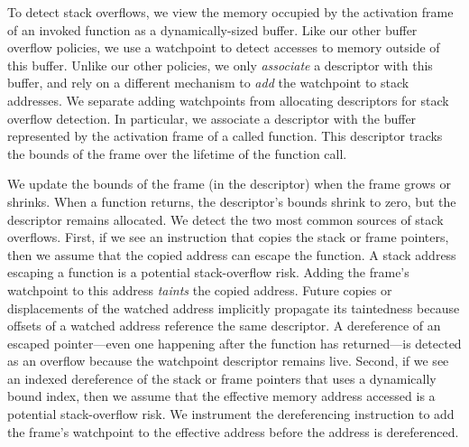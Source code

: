 To detect stack overflows, we view the memory occupied by the activation frame of an invoked function as a dynamically-sized buffer. Like our other buffer overflow policies, we use a watchpoint to detect accesses to memory outside of this buffer. Unlike our other policies, we only \emph{associate} a descriptor with this buffer, and rely on a different mechanism to \emph{add} the watchpoint to stack addresses.
We separate adding watchpoints from allocating descriptors for stack overflow detection. In particular, we associate a descriptor with the buffer represented by the activation frame of a called function. This descriptor tracks the bounds of the frame over the lifetime of the function call.

We update the bounds of the frame (in the descriptor) when the frame grows or shrinks. When a function returns, the descriptor's bounds shrink to zero, but the descriptor remains allocated. We detect the two most common sources of stack overflows. First, if we see an instruction that copies the stack or frame pointers, then we assume that the copied address can escape the function. A stack address escaping a function is a potential stack-overflow risk. Adding the frame's watchpoint to this address \emph{taints} the copied address. Future copies or displacements of the watched address implicitly propagate its taintedness because offsets of a watched address reference the same descriptor. A dereference of an escaped pointer---even one happening after the function has returned---is detected as an overflow because the watchpoint descriptor remains live. Second, if we see an indexed dereference of the stack or frame pointers that uses a dynamically bound index, then we assume that the effective memory address accessed is a potential stack-overflow risk. We instrument the dereferencing instruction to add the frame's watchpoint to the effective address before the address is dereferenced.


